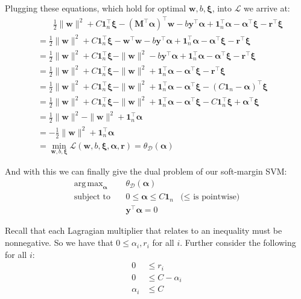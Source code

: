 \documentclass{article}
\renewcommand{\vec}[1]{\mathbf{#1}}
\newcommand{\mat}[1]{\mathbf{#1}}
\DeclareMathOperator*{\argmax}{arg\,max}
\begin{document}
Plugging these equations, which hold for optimal $\vec w,b,\bm\xi$, into $\mathcal L$ we arrive at:
\begin{align*}
    &\phantom{\,\,\,=}\frac{1}{2}\|\vec w\|^2+C\vec1_n^\top\bm\xi-(\mat M^\top\bm\alpha)^\top\vec w-b\vec y^\top\bm\alpha+\vec1_n^\top\bm\alpha-\bm\alpha^\top\bm\xi-\vec r^\top\bm\xi\\
    &=\frac{1}{2}\|\vec w\|^2+C\vec1_n^\top\bm\xi-\vec w^\top\vec w-b\vec y^\top\bm\alpha+\vec1_n^\top\bm\alpha-\bm\alpha^\top\bm\xi-\vec r^\top\bm\xi\tag{eq. 1}\\
    &=\frac{1}{2}\|\vec w\|^2+C\vec1_n^\top\bm\xi-\|\vec w\|^2-b\vec y^\top\bm\alpha+\vec1_n^\top\bm\alpha-\bm\alpha^\top\bm\xi-\vec r^\top\bm\xi\\
    &=\frac{1}{2}\|\vec w\|^2+C\vec1_n^\top\bm\xi-\|\vec w\|^2+\vec1_n^\top\bm\alpha-\bm\alpha^\top\bm\xi-\vec r^\top\bm\xi\tag{eq. 2}\\
    &=\frac{1}{2}\|\vec w\|^2+C\vec1_n^\top\bm\xi-\|\vec w\|^2+\vec1_n^\top\bm\alpha-\bm\alpha^\top\bm\xi-(C\vec1_n-\bm\alpha)^\top\bm\xi\tag{eq. 3}\\
    &=\frac{1}{2}\|\vec w\|^2+C\vec1_n^\top\bm\xi-\|\vec w\|^2+\vec1_n^\top\bm\alpha-\bm\alpha^\top\bm\xi-C\vec1_n^\top\bm\xi+\bm\alpha^\top\bm\xi\\
    &=\frac{1}{2}\|\vec w\|^2-\|\vec w\|^2+\vec1_n^\top\bm\alpha\\
    &=-\frac{1}{2}\|\vec w\|^2+\vec1_n^\top\bm\alpha\\
    &=\min_{\vec w,b,\bm\xi}\mathcal L(\vec w,b,\bm\xi,\bm\alpha,\vec r)=\theta_{\mathcal D}(\bm\alpha)
\end{align*}

And with this we can finally give the dual problem of our soft-margin SVM:
$$\begin{array}{rcll}
    \displaystyle\argmax_{\bm\alpha} &~ &\theta_{\mathcal D}(\bm\alpha)&\\
    \text{subject to}&~ &0\le\bm\alpha\le C\vec 1_n&\text{($\le$ is pointwise)}\\
    &~ &\vec y^\top\bm\alpha=0
\end{array}$$
\newpage

Recall that each Lagragian multiplier that relates to an inequality must be nonnegative. So we have that $0\le\alpha_i,r_i$ for all $i$. Further consider the following for all $i$:
\begin{align*}
    0&\le r_i\tag{see above}\\
    0&\le C-\alpha_i\tag{eq. 3}\\
    \alpha_i&\le C
\end{align*}
\end{document}
